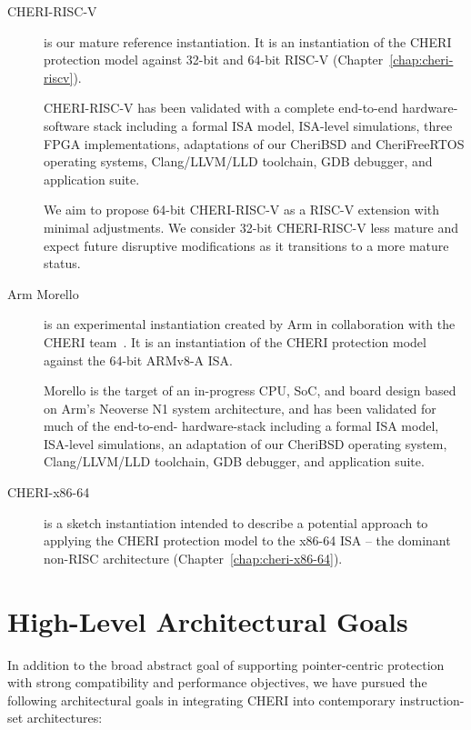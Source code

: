 \begin{description}
\item[CHERI-RISC-V] is our mature reference instantiation.
  It is an instantiation of the CHERI protection model against 32-bit and
  64-bit RISC-V (Chapter~\ref{chap:cheri-riscv}).

  CHERI-RISC-V has been validated with a complete end-to-end hardware-software
  stack including a formal ISA model, ISA-level simulations, three FPGA
  implementations, adaptations of our CheriBSD and CheriFreeRTOS operating
  systems, Clang/LLVM/LLD toolchain, GDB debugger, and application suite.

  We aim to propose 64-bit CHERI-RISC-V as a RISC-V extension with
  minimal adjustments.  We consider 32-bit CHERI-RISC-V less mature
  and expect future disruptive modifications as it transitions to a more mature
  status.

\item[Arm Morello] is an experimental instantiation created by Arm
  in collaboration with the CHERI team~\cite{arm-morello}.
  It is an instantiation of the CHERI protection model against the 64-bit
  ARMv8-A ISA.

  Morello is the target of an in-progress CPU, SoC, and board design based on
  Arm's Neoverse N1 system architecture, and has been validated for much of
  the end-to-end- hardware-stack including a formal ISA model, ISA-level
  simulations, an adaptation of our CheriBSD operating system, Clang/LLVM/LLD
  toolchain, GDB debugger, and application suite.

\item[CHERI-x86-64] is a sketch instantiation intended to describe
  a potential approach to applying the CHERI protection model to the x86-64
  ISA -- the dominant non-RISC architecture (Chapter~\ref{chap:cheri-x86-64}).
\end{description}

\section{High-Level Architectural Goals}

In addition to the broad abstract goal of supporting pointer-centric
protection with strong compatibility and performance objectives, we have
pursued the following architectural goals in integrating CHERI into
contemporary instruction-set architectures:

